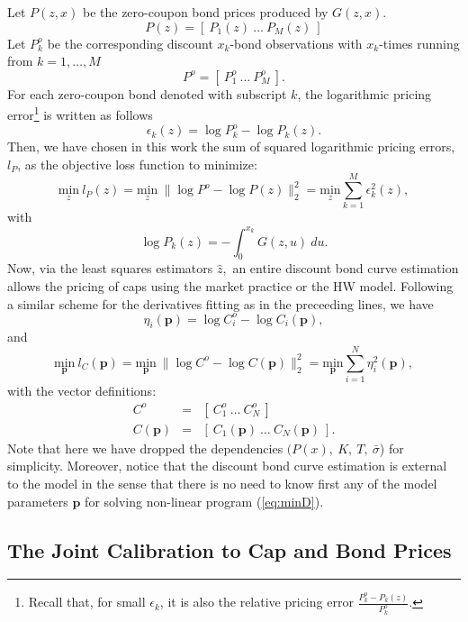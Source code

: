 Let $P(z,x)$ be the zero-coupon bond prices produced by $G(z,x)$. 
$$
P(z)= \left[\:P_1(z)\:\dots\:P_M(z)\:\right]
$$
Let $P^o_k$ be the corresponding discount $x_k$-bond observations with
$x_k$-times running from $k=1,\dots,M$
$$
P^o= \left[\:P^o_1\:\dots\:P^o_M\:\right].
$$
For each zero-coupon bond denoted with subscript $k$,
the logarithmic pricing error\footnote{Recall that, for small
  $\epsilon_k$, it is also the relative pricing error
  $\frac{P^o_k-P_k(z)}{P^o_k}$.} is written as follows  
$$
\epsilon_k(z)=\log P_k^o-\log P_k(z).
$$
Then, we have chosen in this work the sum of squared logarithmic pricing errors,
$l_P$, as the objective loss function to minimize:
\begin{equation}
\label{eq:minD}
\underset{z}{\textrm{min}}\:l_P(z)=\underset{z}{\textrm{min}}~\|\log
P^o-\log
P(z)\|^2_2=\underset{z}{\textrm{min}}\sum_{k=1}^M\epsilon^2_k(z),  
\end{equation}
with 
$$\log P_k(z)=-\int_0^{x_k} G(z,u)\: du.$$
Now, via the least squares estimators $\hat{z},$ an entire discount
bond curve estimation allows the pricing of caps using the market
practice or the HW model. Following a similar scheme for the
derivatives fitting as in the preceeding lines, we have  
$$
\eta_i(\boldsymbol p)=\log  C_i^o-\log  C_i(\boldsymbol p),
$$ and
\begin{equation}
\label{eq:minC}
\underset{\boldsymbol p}{\textrm{min}}\:
l_C(\boldsymbol p)=\underset{\boldsymbol p}{\textrm{min}}~\|\log  C^o-\log
C(\boldsymbol p)\|^2_2=\underset{\boldsymbol p}{\textrm{min}}\sum_{i=1}^N\eta^2_i(\boldsymbol p),  
\end{equation}
with the vector definitions:
\begin{eqnarray}
C^o&=& \left[\:C^o_1\:\dots\:C^o_N\:\right]\\
C(\boldsymbol p) &=& \left[\:C_1(\boldsymbol p)\:\dots\:C_N(\boldsymbol p)\:\right].
\end{eqnarray}
Note that here we have dropped the dependencies
$(P(x),\:K,\:T,\:\bar\sigma$)  for simplicity. Moreover, notice that
the discount bond curve estimation is external to the model in the
sense that there is no need to know first any of the model parameters
$\boldsymbol p$ for solving non-linear program (\ref{eq:minD}).

\subsection{The Joint Calibration to Cap and Bond Prices}

